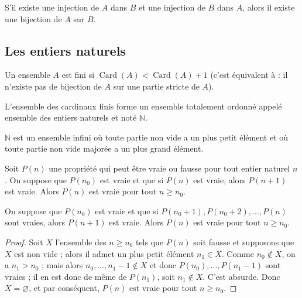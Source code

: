 \begin{thm}
S'il existe une injection de $A$ dans $B$ et une injection de $B$ dans $A$, alors il existe une bijection de $A$ sur $B$.
\end{thm}

\subsection{Les entiers naturels}

\begin{de}
Un ensemble $A$ est fini si $\operatorname{Card}(A) < \operatorname{Card}(A) + 1$ (c'est équivalent à : il n'existe pas de bijection de $A$ sur une partie stricte de $A$).
\end{de}

\begin{prop}
L'ensemble des cardinaux finis forme un ensemble totalement ordonné appelé ensemble des entiers naturels et noté $\mathbb{N}$.
\end{prop}

\begin{axiom}[de Peano]
$\mathbb{N}$ est un ensemble infini où toute partie non vide a un plus petit élément et où toute partie non vide majorée a un plus grand élément.
\end{axiom}

\begin{thm}
Soit $P(n)$ une propriété qui peut être vraie ou fausse pour tout entier naturel $n$. On suppose que $P(n_0)$ est vraie et que si $P(n)$ est vraie, alors $P(n + 1)$ est vraie. Alors $P(n)$ est vraie pour tout $n \geq n_0$.
\end{thm}

\begin{thm}
On suppose que $P(n_0)$ est vraie et que si $P(n_0 + 1), P(n_0 + 2), \ldots, P(n)$ sont vraies, alors $P(n + 1)$ est vraie. Alors $P(n)$ est vraie pour tout $n \geq n_0$.
\end{thm}

\begin{proof}
Soit $X$ l'ensemble des $n \geq n_0$ tels que $P(n)$ soit fausse et supposons que $X$ est non vide ; alors il admet un plus petit élément $n_1 \in X$. Comme $n_0 \notin X$, on a $n_1 > n_0$ ; mais alors $n_0, \ldots, n_1 - 1 \notin X$ et donc $P(n_0), \ldots, P(n_1 - 1)$ sont vraies ; il en est donc de même de $P(n_1)$, soit $n_1 \notin X$. C'est absurde. Donc $X = \varnothing$, et par conséquent, $P(n)$ est vraie pour tout $n \geq n_0$.
\end{proof}